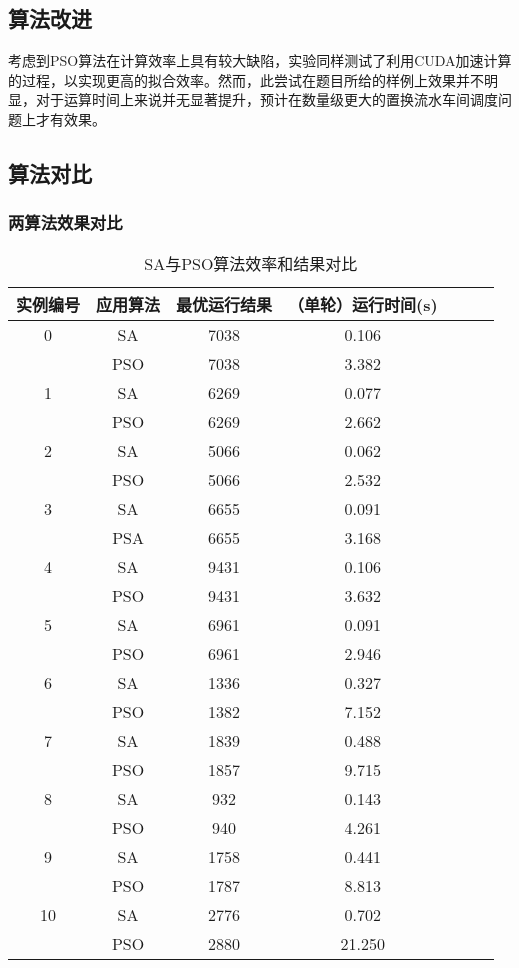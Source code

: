 \documentclass[12pt]{article}
\begin{document}
	\subsection{算法改进}
	考虑到PSO算法在计算效率上具有较大缺陷，实验同样测试了利用CUDA加速计算的过程，以实现更高的拟合效率。然而，此尝试在题目所给的样例上效果并不明显，对于运算时间上来说并无显著提升，预计在数量级更大的置换流水车间调度问题上才有效果。
	
	\subsection{算法对比}
	\subsubsection{两算法效果对比}
	
	\begin{table}[H]
		\centering
		\caption{SA与PSO算法效率和结果对比}
		\begin{tabular}{ccccccc}
			\toprule %
			实例编号&应用算法&最优运行结果&（单轮）运行时间(s) \\ %
			\midrule %
			0&SA&7038&0.106\\
			&PSO&7038&3.382\\
			1&SA&6269&0.077\\
			&PSO&6269&2.662\\
			2&SA&5066&0.062\\
			&PSO&5066&2.532\\
			3&SA&6655&0.091\\
			&PSA&6655&3.168\\
			4&SA&9431&0.106\\
			&PSO&9431&3.632\\
			5&SA&6961&0.091\\
			&PSO&6961&2.946\\
			6&SA&1336&0.327\\
			&PSO&1382&7.152\\
			7&SA&1839&0.488\\
			&PSO&1857&9.715\\
			8&SA&932&0.143\\
			&PSO&940&4.261\\
			9&SA&1758&0.441\\
			&PSO&1787&8.813\\
			10&SA&2776&0.702\\
			&PSO&2880&21.250\\
			\bottomrule %
		\end{tabular}
	\end{table}
	
\end{document}
